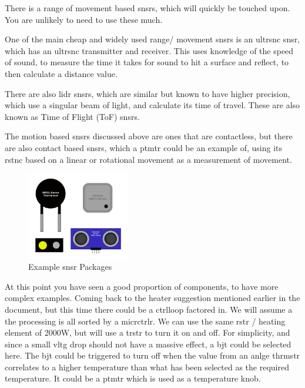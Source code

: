 \documentclass[a4paper,11pt]{report}
\newcommand{\Examples}[1] %
{
\par\noindent %
\phantomsection %
\todo[inline, color=red!30]{\textbf{#1}} %
\vspace{1em} %
}
\begin{document}
There is a range of movement based \gls{snsr}s, which will quickly be touched upon. You are unlikely to need to use these much.

One of the main cheap and widely used range/ movement \gls{snsr}s is an \gls{ultrsnc} \gls{snsr}, which has an \gls{ultrsnc} transmitter and receiver. This uses knowledge of the speed of sound, to measure the time it takes for sound to hit a surface and reflect, to then calculate a distance value.

There are also \gls{lidr} \gls{snsr}s, which are similar but known to have higher precision, which use a singular beam of light, and calculate its time of travel. These are also known as Time of Flight (ToF) \gls{snsr}s.

The motion based \gls{snsr}s discussed above are ones that are contactless, but there are also contact based \gls{snsr}s, which a \gls{ptmtr} could be an example of, using its \gls{rstnc} based on a linear or rotational movement as a measurement of movement.

\begin{figure}[H]
\centering
\includegraphics[width=0.4\textwidth]{sensorPackages}
\caption{Example \gls{snsr} Packages}
\end{figure}

\Examples{Examples}

At this point you have seen a good proportion of components, to have more complex examples. Coming back to the heater suggestion mentioned earlier in the document, but this time there could be a \gls{ctrlloop} factored in. We will assume a the processing is all sorted by a \gls{micrctrlr}. We can use the same \gls{rstr} / heating element of 2000W, but will use a \gls{trstr} to turn it on and off. For simplicity, and since a small \gls{vltg} drop should not have a massive effect, a \gls{bjt} could be selected here. The \gls{bjt} could be triggered to turn off when the value from an \gls{anlge} \gls{thrmstr} correlates to a higher temperature than what has been selected as the required temperature. It could be a \gls{ptmtr} which is used as a temperature knob.
\end{document}
